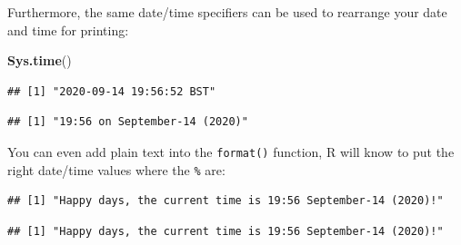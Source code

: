 \documentclass[
  12pt,
  krantz2]{krantz}
\makeatletter
\newenvironment{Shaded}{\begin{snugshade}}{\end{snugshade}}
\newcommand{\KeywordTok}[1]{\textcolor[rgb]{0.13,0.29,0.53}{\textbf{#1}}}
\newcommand{\NormalTok}[1]{#1}
\newcommand{\OperatorTok}[1]{\textcolor[rgb]{0.81,0.36,0.00}{\textbf{#1}}}
\newcommand{\StringTok}[1]{\textcolor[rgb]{0.31,0.60,0.02}{#1}}
\newenvironment{kframe}{%
\medskip{}
\setlength{\fboxsep}{.8em}
 \def\at@end@of@kframe{}%
 \ifinner\ifhmode%
  \def\at@end@of@kframe{\end{minipage}}%
  \begin{minipage}{\columnwidth}%
 \fi\fi%
 \def\FrameCommand##1{\hskip\@totalleftmargin \hskip-\fboxsep
 \colorbox{shadecolor}{##1}\hskip-\fboxsep
     \hskip-\linewidth \hskip-\@totalleftmargin \hskip\columnwidth}%
 \MakeFramed {\advance\hsize-\width
   \@totalleftmargin\z@ \linewidth\hsize
   \@setminipage}}%
 {\par\unskip\endMakeFramed%
 \at@end@of@kframe}
\renewenvironment{Shaded}{\begin{kframe}}{\end{kframe}}
\makeatother
\begin{document}
Furthermore, the same date/time specifiers can be used to rearrange your date and time for printing:

\begin{Shaded}
\begin{Highlighting}[]
\KeywordTok{Sys.time}\NormalTok{()}
\end{Highlighting}
\end{Shaded}

\begin{verbatim}
## [1] "2020-09-14 19:56:52 BST"
\end{verbatim}

\begin{Shaded}
\end{Shaded}

\begin{verbatim}
## [1] "19:56 on September-14 (2020)"
\end{verbatim}

You can even add plain text into the \texttt{format()} function, R will know to put the right date/time values where the \texttt{\%} are:

\begin{Shaded}
\end{Shaded}

\begin{verbatim}
## [1] "Happy days, the current time is 19:56 September-14 (2020)!"
\end{verbatim}

\begin{Shaded}
\end{Shaded}

\begin{verbatim}
## [1] "Happy days, the current time is 19:56 September-14 (2020)!"
\end{verbatim}
\end{document}
